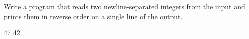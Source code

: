 




Write a program that reads two newline-separated integers from the input and prints them in reverse order on a single line of the output.

47
42
\koniec

